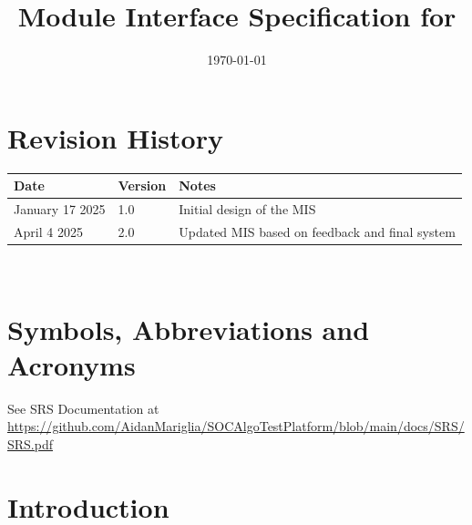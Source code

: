 \documentclass[12pt, titlepage]{article}
\begin{document}
\title{Module Interface Specification for \progname{}}

\author{\authname}

\date{\today}

\maketitle


\section{Revision History}

\begin{tabularx}{\textwidth}{p{3cm}p{2cm}X}
\toprule {\bf Date} & {\bf Version} & {\bf Notes}\\
\midrule
January 17 2025 & 1.0 & Initial design of the MIS\\
April 4 2025 & 2.0 & Updated MIS based on feedback and final system\\
\bottomrule
\end{tabularx}

~\newpage

\section{Symbols, Abbreviations and Acronyms}

See SRS Documentation at \url{https://github.com/AidanMariglia/SOCAlgoTestPlatform/blob/main/docs/SRS/SRS.pdf}

\newpage

\tableofcontents

\newpage


\section{Introduction}
\end{document}
